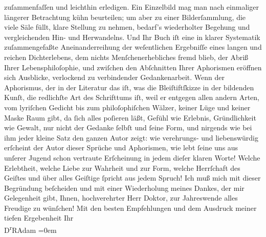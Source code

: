 \begin{ledgroupsized}[t]{13cm}
                    zuſammenfaſſen und leichthin erledigen. Ein Einzelbild mag man nach einmaliger
                    längerer Betrachtung {\pb}kühn
                    beurteilen; um aber zu einer Bilderſammlung, die viele Säle füllt, klare
                    Stellung zu nehmen, bedarf’s wiederholter Begehung und vergleichenden Hin- und
                    Herwandelns. Und Ihr Buch iſt eine in klarer Systematik zuſammengefaßte
                    Aneinanderreihung der weſentlichen Ergebniſſe eines langen und reichen
                    Dichterlebens, dem nichts Menſchenerhebliches fremd blieb, der Abriß Ihrer
                    Lebensphiloſophie, und zwiſchen den Abſchnitten Ihrer Aphorismen eröffnen sich
                    Ausblicke, verlockend zu verbindender Gedankenarbeit. Wenn der Aphorismus, der
                    in der Literatur das iſt, was die Bleiſtiftſkizze in der bildenden Kunſt, die
                    redlichſte Art des Schrifttums iſt, weil er entgegen allen andern Arten, vom
                    lyriſchen Gedicht bis zum philoſophiſchen Wälzer, keiner Lüge und keiner Maske
                    Raum  gibt, {\pb}da ſich alles poſieren läßt, Gefühl
                    wie Erlebnis, Gründlichkeit wie Gewalt, nur nicht der Gedanke ſelbſt und ſeine
                    Form, und nirgends wie bei ihm jeder kleine Satz den ganzen Autor zeigt: wie
                    verehrungs- und liebenswürdig erſcheint der Autor dieser Sprüche und Aphorismen,
                    wie lebt ſeine uns aus unſerer Jugend schon vertraute Erſcheinung in jedem
                    dieſer klaren Worte! Welche Erlebtheit, welche Liebe zur Wahrheit und zur Form,
                    welche Herrſchaft des Geiſtes und über alles Geiſtige ſpricht aus jedem
                    Spruch!\pend
           \pstart
           Ich muß mich mit dieser Begründung beſcheiden und mit einer Wiederholung meines
                    Dankes, der mir Gelegenheit gibt, Ihnen, hochverehrter Herr Doktor, zur
                    Jahreswende alles Freudige zu wünſchen!\pend
           \pstart
           Mit den besten Empfehlungen und {\pb}dem
                    Ausdruck meiner tiefen Ergebenheit\pend
           \pstart
           Ihr{\\[\baselineskip]}\spacefill\mbox{D\textsuperscript{r}RAdam}\pend
           \leftskip=0em{}
         
         \endnumbering{}\end{ledgroupsized}  \newcommand{\dateiname}{L02497}\newcommand{\titel}{Robert Adam an Arthur Schnitzler, 30. 12. 1927}\newcommand{\editorInnen}{Martin Anton Müller und Gerd-Hermann Susen}
      